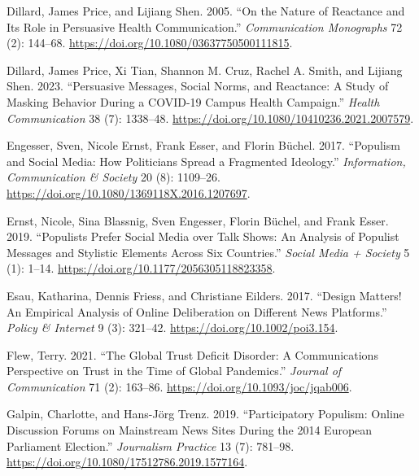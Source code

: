 \documentclass[
]{ccr}
\newlength{\cslhangindent}
\newlength{\cslentryspacingunit} %
\newenvironment{CSLReferences}[2] %
 {%
  \setlength{\parindent}{0pt}
  \ifodd #1
  \let\oldpar\par
  \def\par{\hangindent=\cslhangindent\oldpar}
  \fi
  \setlength{\parskip}{#2\cslentryspacingunit}
 }%
 {}
\begin{document}
\begin{CSLReferences}{1}{0}
\leavevmode{}%
Dillard, James Price, and Lijiang Shen. 2005. {``On the Nature of
Reactance and Its Role in Persuasive Health Communication.''}
\emph{Communication Monographs} 72 (2): 144--68.
\url{https://doi.org/10.1080/03637750500111815}.

\leavevmode{}%
Dillard, James Price, Xi Tian, Shannon M. Cruz, Rachel A. Smith, and
Lijiang Shen. 2023. {``Persuasive {Messages}, {Social Norms}, and
{Reactance}: {A Study} of {Masking Behavior} During a {COVID-19 Campus
Health Campaign}.''} \emph{Health Communication} 38 (7): 1338--48.
\url{https://doi.org/10.1080/10410236.2021.2007579}.

\leavevmode{}%
Engesser, Sven, Nicole Ernst, Frank Esser, and Florin Büchel. 2017.
{``Populism and Social Media: How Politicians Spread a Fragmented
Ideology.''} \emph{Information, Communication \& Society} 20 (8):
1109--26. \url{https://doi.org/10.1080/1369118X.2016.1207697}.

\leavevmode{}%
Ernst, Nicole, Sina Blassnig, Sven Engesser, Florin Büchel, and Frank
Esser. 2019. {``Populists Prefer Social Media over Talk Shows: {An}
Analysis of Populist Messages and Stylistic Elements Across Six
Countries.''} \emph{Social Media + Society} 5 (1): 1--14.
\url{https://doi.org/10.1177/2056305118823358}.

\leavevmode{}%
Esau, Katharina, Dennis Friess, and Christiane Eilders. 2017. {``Design
Matters! {An} Empirical Analysis of Online Deliberation on Different
News Platforms.''} \emph{Policy \& Internet} 9 (3): 321--42.
\url{https://doi.org/10.1002/poi3.154}.

\leavevmode{}%
Flew, Terry. 2021. {``The {Global Trust Deficit Disorder}: {A
Communications Perspective} on {Trust} in the {Time} of {Global
Pandemics}.''} \emph{Journal of Communication} 71 (2): 163--86.
\url{https://doi.org/10.1093/joc/jqab006}.

\leavevmode{}%
Galpin, Charlotte, and Hans-Jörg Trenz. 2019. {``Participatory Populism:
{Online} Discussion Forums on Mainstream News Sites During the 2014
{European Parliament} Election.''} \emph{Journalism Practice} 13 (7):
781--98. \url{https://doi.org/10.1080/17512786.2019.1577164}.


\end{CSLReferences}
\end{document}
